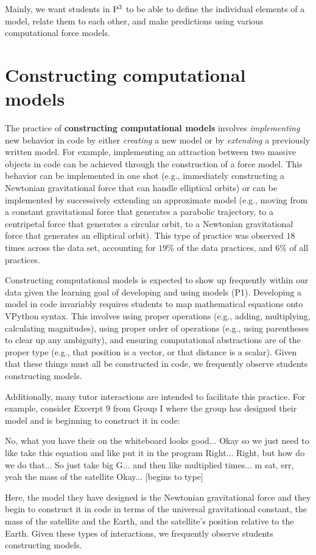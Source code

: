 \documentclass{msuphddissertation}
\begin{document}
\begin{doublespace}
\begin{appendices}
Mainly, we want students in ${\rm P}^{3}$ to be able to define the individual elements of a model, relate them to each other, and make predictions using various computational force models.

\section*{Constructing computational models}

The practice of \textbf{constructing computational models} involves \textit{implementing} new behavior in code by either \textit{creating} a new model or by \textit{extending} a previously written model.  For example, implementing an attraction between two massive objects in code can be achieved through the construction of a force model.  This behavior can be implemented in one shot (e.g., immediately constructing a Newtonian gravitational force that can handle elliptical orbits) or can be implemented by successively extending an approximate model (e.g., moving from a constant gravitational force that generates a parabolic trajectory, to a centripetal force that generates a circular orbit, to a Newtonian gravitational force that generates an elliptical orbit).  This type of practice was observed $18$ times across the data set, accounting for $19\%$ of the data practices, and $6\%$ of all practices.

Constructing computational models is expected to show up frequently within our data given the learning goal of developing and using models (P1).  Developing a model in code invariably requires students to map mathematical equations onto VPython syntax.  This involves using proper operations (e.g., adding, multiplying, calculating magnitudes), using proper order of operations (e.g., using parentheses to clear up any ambiguity), and ensuring computational abstractions are of the proper type (e.g., that position is a vector, or that distance is a scalar).  Given that these things must all be constructed in code, we frequently observe students constructing models.

Additionally, many tutor interactions are intended to facilitate this practice.  For example, consider Excerpt 9 from Group I where the group has designed their model and is beginning to construct it in code: \begin{description}
\TA No, what you have their {on the whiteboard} looks good...
\SD Okay so we just need to like take this equation and like
\SD put it in the program
\TA Right...
\SD Right, but how do we do that...
\SC So just take big G... and then like multiplied times...
\SC m sat, err, yeah the mass of the satellite
\SA Okay... [begins to type]
\end{description}  Here, the model they have designed is the Newtonian gravitational force and they begin to construct it in code in terms of the universal gravitational constant, the mass of the satellite and the Earth, and the satellite's position relative to the Earth.  Given these types of interactions, we frequently observe students constructing models.


\end{appendices}
\end{doublespace}
\end{document}
